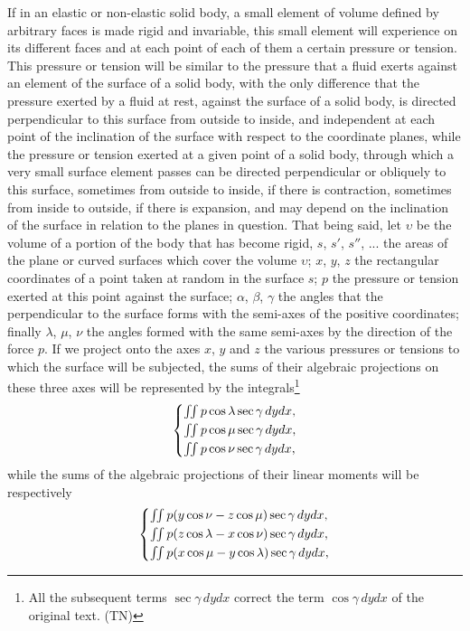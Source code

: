 \documentclass[leqno,openright,smallroyalvopaper,8pt,twoside,showtrims]{memoir}
\begin{document}
If in an elastic or non-elastic solid body, a small element of volume defined by arbitrary faces is made rigid and invariable, this small element will experience on its different faces and at each point of each of them a certain pressure or tension. This pressure or tension will be similar to the pressure that a fluid exerts against an element of the surface of a solid body, with the only difference that the pressure exerted by a fluid at rest, against the surface of a solid body, is directed perpendicular to this surface from outside to inside, and independent at each point of the inclination of the surface with respect to the coordinate planes, while the pressure or tension exerted at a given point of a solid body, through which a very small surface element passes can be directed perpendicular or obliquely to this surface, sometimes from outside to inside, if there is contraction, sometimes from inside to outside, if there is expansion, and may depend on the inclination of the surface in relation to the planes in question. That being said, let $\upsilon$ be the volume of a portion of the body that has become rigid, $s$, $s'$, $s''$, ... the areas of the plane or curved surfaces which cover the volume $\upsilon$; $x$, $y$, $z$ the rectangular coordinates of a point taken at random in the surface $s$; $p$ the pressure or tension exerted at this point against the surface; $\alpha$, $\beta$, $\gamma$ the angles that the perpendicular to the surface forms with the semi-axes of the positive coordinates; finally $\lambda$, $\mu$, $\nu$ the angles formed with the same semi-axes by the direction of the force $p$. If we project onto the axes $x$, $y$ and $z$ the various pressures or tensions to which the surface will be subjected, the sums of their algebraic projections on these three axes will be represented by the integrals\footnote{All the subsequent terms $\sec\gamma\, dydx$ correct the term  $\cos\gamma\, dydx$ of the original text. (TN)}
 \begin{equation}\label{eq:forcas}
   \begin{dcases}
     \textstyle\iint   p\cos\lambda\sec\gamma\, dydx,\\
     \textstyle\iint   p\cos\mu\sec\gamma\, dydx,\\
     \textstyle\iint   p\cos\nu\sec\gamma\, dydx,
   \end{dcases}
 \end{equation}
while the sums of the algebraic projections of their linear moments will be respectively
 \begin{equation}
   \begin{dcases}
     \textstyle\iint   p(y\cos\nu-z\cos\mu)\sec\gamma\, dydx,\\
     \textstyle\iint   p(z\cos\lambda-x\cos\nu)\sec\gamma\, dydx,\\
     \textstyle\iint   p(x\cos\mu-y\cos\lambda)\sec\gamma\, dydx,
   \end{dcases}
 \end{equation}
\end{document}
